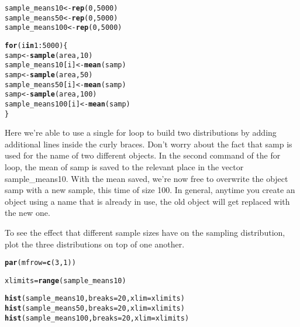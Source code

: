 \documentclass{article}\usepackage[]{graphicx}\usepackage[]{color}
\makeatletter
\newcommand{\hlnum}[1]{\textcolor[rgb]{0.686,0.059,0.569}{#1}}%
\newcommand{\hlopt}[1]{\textcolor[rgb]{0,0,0}{#1}}%
\newcommand{\hlstd}[1]{\textcolor[rgb]{0.345,0.345,0.345}{#1}}%
\newcommand{\hlkwa}[1]{\textcolor[rgb]{0.161,0.373,0.58}{\textbf{#1}}}%
\newcommand{\hlkwb}[1]{\textcolor[rgb]{0.69,0.353,0.396}{#1}}%
\newcommand{\hlkwc}[1]{\textcolor[rgb]{0.333,0.667,0.333}{#1}}%
\newcommand{\hlkwd}[1]{\textcolor[rgb]{0.737,0.353,0.396}{\textbf{#1}}}%
\newenvironment{kframe}{%
 \def\at@end@of@kframe{}%
 \ifinner\ifhmode%
  \def\at@end@of@kframe{\end{minipage}}%
  \begin{minipage}{\columnwidth}%
 \fi\fi%
 \def\FrameCommand##1{\hskip\@totalleftmargin \hskip-\fboxsep
 \colorbox{shadecolor}{##1}\hskip-\fboxsep
     \hskip-\linewidth \hskip-\@totalleftmargin \hskip\columnwidth}%
 \MakeFramed {\advance\hsize-\width
   \@totalleftmargin\z@ \linewidth\hsize
   \@setminipage}}%
 {\par\unskip\endMakeFramed%
 \at@end@of@kframe}
\newenvironment{knitrout}{}{} %
\makeatother
\begin{document}
\begin{knitrout}
\color{fgcolor}\begin{kframe}
\begin{alltt}
\hlstd{sample_means10} \hlkwb{<-} \hlkwd{rep}\hlstd{(}\hlnum{0}\hlstd{,} \hlnum{5000}\hlstd{)}
\hlstd{sample_means50} \hlkwb{<-} \hlkwd{rep}\hlstd{(}\hlnum{0}\hlstd{,} \hlnum{5000}\hlstd{)}
\hlstd{sample_means100} \hlkwb{<-} \hlkwd{rep}\hlstd{(}\hlnum{0}\hlstd{,} \hlnum{5000}\hlstd{)}

\hlkwa{for} \hlstd{(i} \hlkwa{in} \hlnum{1}\hlopt{:}\hlnum{5000}\hlstd{) \{}
    \hlstd{samp} \hlkwb{<-} \hlkwd{sample}\hlstd{(area,} \hlnum{10}\hlstd{)}
    \hlstd{sample_means10[i]} \hlkwb{<-} \hlkwd{mean}\hlstd{(samp)}
    \hlstd{samp} \hlkwb{<-} \hlkwd{sample}\hlstd{(area,} \hlnum{50}\hlstd{)}
    \hlstd{sample_means50[i]} \hlkwb{<-} \hlkwd{mean}\hlstd{(samp)}
    \hlstd{samp} \hlkwb{<-} \hlkwd{sample}\hlstd{(area,} \hlnum{100}\hlstd{)}
    \hlstd{sample_means100[i]} \hlkwb{<-} \hlkwd{mean}\hlstd{(samp)}
\hlstd{\}}
\end{alltt}
\end{kframe}
\end{knitrout}


Here we're able to use a single for loop to build two distributions by adding additional lines inside the curly braces.  Don't worry about the fact that \hlstd{samp} is used for the name of two different objects.  In the second command of the for loop, the mean of \hlstd{samp} is saved to the relevant place in the vector \hlstd{sample\_means10}.  With the mean saved, we're now free to overwrite the object \hlstd{samp} with a new sample, this time of size 100.  In general, anytime you create an object using a name that is already in use, the old object will get replaced with the new one.

To see the effect that different sample sizes have on the sampling distribution, plot the three distributions on top of one another.

\begin{knitrout}
\color{fgcolor}\begin{kframe}
\begin{alltt}
\hlkwd{par}\hlstd{(}\hlkwc{mfrow} \hlstd{=} \hlkwd{c}\hlstd{(}\hlnum{3}\hlstd{,} \hlnum{1}\hlstd{))}

\hlstd{xlimits} \hlkwb{=} \hlkwd{range}\hlstd{(sample_means10)}

\hlkwd{hist}\hlstd{(sample_means10,} \hlkwc{breaks} \hlstd{=} \hlnum{20}\hlstd{,} \hlkwc{xlim} \hlstd{= xlimits)}
\hlkwd{hist}\hlstd{(sample_means50,} \hlkwc{breaks} \hlstd{=} \hlnum{20}\hlstd{,} \hlkwc{xlim} \hlstd{= xlimits)}
\hlkwd{hist}\hlstd{(sample_means100,} \hlkwc{breaks} \hlstd{=} \hlnum{20}\hlstd{,} \hlkwc{xlim} \hlstd{= xlimits)}
\end{alltt}
\end{kframe}
\end{knitrout}
\end{document}
